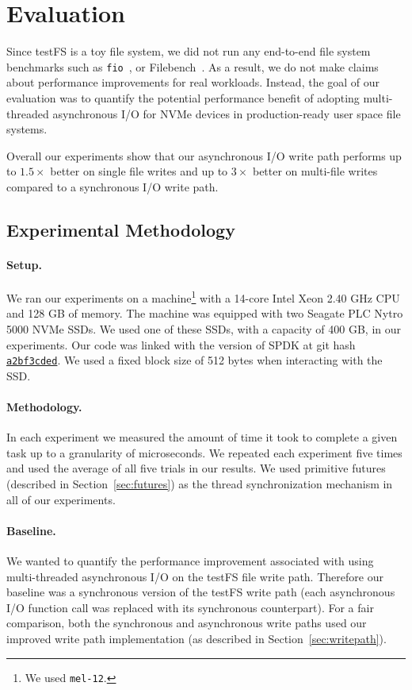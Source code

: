 \section{Evaluation}
Since testFS is a toy file system, we did not run any end-to-end file system
benchmarks such as {\tt fio}~\cite{fio}, or
Filebench~\cite{filebench-tarasov16}. As a result, we do not make claims about
performance improvements for real workloads. Instead, the goal of our
evaluation was to quantify the potential performance benefit of adopting
multi-threaded asynchronous I/O for NVMe devices in production-ready user space
file systems.

Overall our experiments show that our asynchronous I/O write path performs up
to $1.5\times$ better on single file writes and up to $3\times$ better on
multi-file writes compared to a synchronous I/O write path.

\subsection{Experimental Methodology}
\paragraph{Setup.}
We ran our experiments on a machine\footnote{We used {\tt mel-12}.} with a
14-core Intel Xeon 2.40 GHz CPU and 128 GB of memory. The machine was equipped
with two Seagate PLC Nytro 5000 NVMe SSDs. We used one of these SSDs, with a
capacity of 400 GB, in our experiments. Our code was linked with the version of
SPDK at git hash
\href{https://github.com/spdk/spdk/commit/a2bf3cded37b7cc7e402eae80da90891f921b56d}{\tt a2bf3cded}.
We used a fixed block size of 512 bytes when interacting with the SSD.

\paragraph{Methodology.}
In each experiment we measured the amount of time it took to complete a given
task up to a granularity of microseconds. We repeated each experiment five
times and used the average of all five trials in our results. We used primitive
futures (described in Section~\ref{sec:futures}) as the thread synchronization
mechanism in all of our experiments.

\paragraph{Baseline.}
We wanted to quantify the performance improvement associated with using
multi-threaded asynchronous I/O on the testFS file write path. Therefore
our baseline was a synchronous version of the testFS write path (each
asynchronous I/O function call was replaced with its synchronous counterpart).
For a fair comparison, both the synchronous and asynchronous write paths used
our improved write path implementation (as described in
Section~\ref{sec:writepath}).

